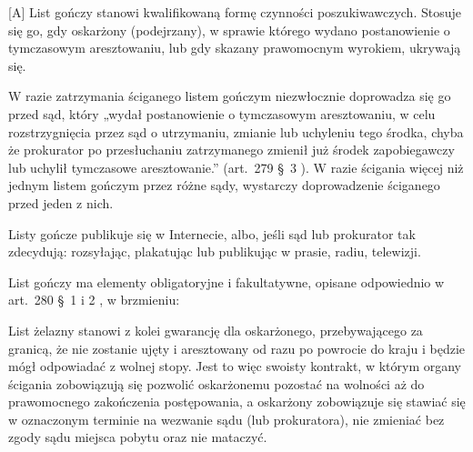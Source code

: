 \setcounter{zagc}{86}[{\kolor A}]
List gończy stanowi kwalifikowaną formę czynności poszukiwawczych. Stosuje się go, gdy oskarżony (podejrzany), w sprawie którego wydano postanowienie o tymczasowym aresztowaniu, lub gdy skazany prawomocnym wyrokiem, ukrywają się.\medskip

W razie zatrzymania ściganego listem gończym niezwłocznie doprowadza się go przed sąd, który „wydał postanowienie o tymczasowym aresztowaniu, w celu rozstrzygnięcia przez sąd o utrzymaniu, zmianie lub uchyleniu tego środka, chyba że prokurator po przesłuchaniu zatrzymanego zmienił już środek zapobiegawczy lub uchylił tymczasowe aresztowanie.” (art. 279 § 3 ). W razie ścigania więcej niż jednym listem gończym przez różne sądy, wystarczy doprowadzenie ściganego przed jeden z nich.\medskip

Listy gończe publikuje się w Internecie, albo, jeśli sąd lub prokurator tak zdecydują: rozsyłając, plakatując lub publikując w prasie, radiu, telewizji.\medskip

List gończy ma elementy obligatoryjne i fakultatywne, opisane odpowiednio w art. 280 § 1 i 2 , w brzmieniu:\\\medskip

List żelazny stanowi z kolei gwarancję dla oskarżonego, przebywającego za granicą, że nie zostanie ujęty i aresztowany od razu po powrocie do kraju i będzie mógł odpowiadać z wolnej stopy. Jest to więc swoisty kontrakt, w którym organy ścigania zobowiązują się pozwolić oskarżonemu pozostać na wolności aż do prawomocnego zakończenia postępowania, a oskarżony zobowiązuje się stawiać się w oznaczonym terminie na wezwanie sądu (lub prokuratora), nie zmieniać bez zgody sądu miejsca pobytu oraz nie mataczyć.
